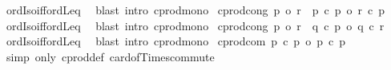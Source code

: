 \begin{isabellebody}
%
\isadelimproof
%
\endisadelimproof
%
\isatagproof
{}\isamarkupfalse%
\ ordIso{\isacharunderscore}{\kern0pt}iff{\isacharunderscore}{\kern0pt}ordLeq\ \isamarkupfalse%
\ {\isacharparenleft}{\kern0pt}blast\ intro{\isacharcolon}{\kern0pt}\ cprod{\isacharunderscore}{\kern0pt}mono{\isacharparenright}{\kern0pt}%
\endisatagproof
{\isafoldproof}%
%
\isadelimproof
\isanewline
%
\endisadelimproof
\isanewline
{}\isamarkupfalse%
\ cprod{\isacharunderscore}{\kern0pt}cong{}{\isacharcolon}{\kern0pt}\ {\isachardoublequoteopen}{\isasymlbrakk}p{}\ {\isacharequal}{\kern0pt}o\ r{}{\isasymrbrakk}\ {\isasymLongrightarrow}\ p{}\ {\isacharasterisk}{\kern0pt}c\ p{}\ {\isacharequal}{\kern0pt}o\ r{}\ {\isacharasterisk}{\kern0pt}c\ p{}{\isachardoublequoteclose}\isanewline
%
\isadelimproof
%
\endisadelimproof
%
\isatagproof
{}\isamarkupfalse%
\ ordIso{\isacharunderscore}{\kern0pt}iff{\isacharunderscore}{\kern0pt}ordLeq\ \isamarkupfalse%
\ {\isacharparenleft}{\kern0pt}blast\ intro{\isacharcolon}{\kern0pt}\ cprod{\isacharunderscore}{\kern0pt}mono{}{\isacharparenright}{\kern0pt}%
\endisatagproof
{\isafoldproof}%
%
\isadelimproof
\isanewline
%
\endisadelimproof
\isanewline
{}\isamarkupfalse%
\ cprod{\isacharunderscore}{\kern0pt}cong{}{\isacharcolon}{\kern0pt}\ {\isachardoublequoteopen}p{}\ {\isacharequal}{\kern0pt}o\ r{}\ {\isasymLongrightarrow}\ q\ {\isacharasterisk}{\kern0pt}c\ p{}\ {\isacharequal}{\kern0pt}o\ q\ {\isacharasterisk}{\kern0pt}c\ r{}{\isachardoublequoteclose}\isanewline
%
\isadelimproof
%
\endisadelimproof
%
\isatagproof
{}\isamarkupfalse%
\ ordIso{\isacharunderscore}{\kern0pt}iff{\isacharunderscore}{\kern0pt}ordLeq\ \isamarkupfalse%
\ {\isacharparenleft}{\kern0pt}blast\ intro{\isacharcolon}{\kern0pt}\ cprod{\isacharunderscore}{\kern0pt}mono{}{\isacharparenright}{\kern0pt}%
\endisatagproof
{\isafoldproof}%
%
\isadelimproof
\isanewline
%
\endisadelimproof
\isanewline
{}\isamarkupfalse%
\ cprod{\isacharunderscore}{\kern0pt}com{\isacharcolon}{\kern0pt}\ {\isachardoublequoteopen}p{}\ {\isacharasterisk}{\kern0pt}c\ p{}\ {\isacharequal}{\kern0pt}o\ p{}\ {\isacharasterisk}{\kern0pt}c\ p{}{\isachardoublequoteclose}\isanewline
%
\isadelimproof
%
\endisadelimproof
%
\isatagproof
{}\isamarkupfalse%
\ {\isacharparenleft}{\kern0pt}simp\ only{\isacharcolon}{\kern0pt}\ cprod{\isacharunderscore}{\kern0pt}def\ card{\isacharunderscore}{\kern0pt}of{\isacharunderscore}{\kern0pt}Times{\isacharunderscore}{\kern0pt}commute{\isacharparenright}{\kern0pt}%

\end{isabellebody}
